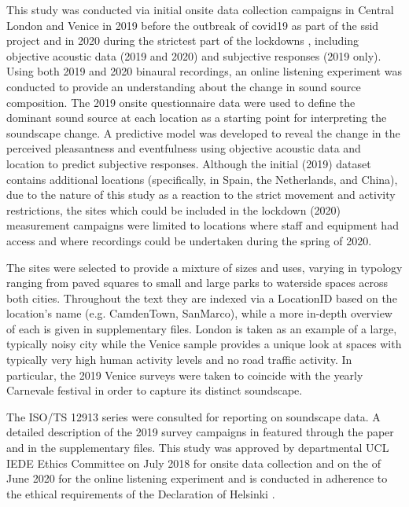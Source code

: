  This study was conducted via initial onsite data collection campaigns in Central London and Venice in 2019 before the outbreak of \gls{covid19} as part of the \gls{ssid} project \citep{Mitchell2020Soundscape} and in 2020 during the strictest part of the lockdowns \citep{Aletta2020Assessing}, including objective acoustic data (2019 and 2020) and subjective responses (2019 only). Using both 2019 and 2020 binaural recordings, an online listening experiment was conducted to provide an understanding about the change in sound source composition. The 2019 onsite questionnaire data were used to define the dominant sound source at each location as a starting point for interpreting the soundscape change. A predictive model was developed to reveal the change in the perceived pleasantness and eventfulness using objective acoustic data and location to predict subjective responses. Although the initial (2019) dataset contains additional locations (specifically, in Spain, the Netherlands, and China), due to the nature of this study as a reaction to the strict movement and activity restrictions, the sites which could be included in the lockdown (2020) measurement campaigns were limited to locations where staff and equipment had access and where recordings could be undertaken during the spring of 2020.

 The sites were selected to provide a mixture of sizes and uses, varying in typology ranging from paved squares to small and large parks to waterside spaces across both cities. Throughout the text they are indexed via a LocationID based on the location's name (e.g. CamdenTown, SanMarco), while a more in-depth overview of each is given in supplementary files. %
 London is taken as an example of a large, typically noisy city while the Venice sample provides a unique look at spaces with typically very high human activity levels and no road traffic activity. In particular, the 2019 Venice surveys were taken to coincide with the yearly Carnevale festival in order to capture its distinct soundscape.

 The ISO/TS 12913 \citep{ISO12913_2_2018IOS} series were consulted for reporting on soundscape data. A detailed description of the 2019 survey campaigns in featured through the paper and in the supplementary files. This study was approved by departmental UCL IEDE Ethics Committee on  July 2018 for onsite data collection and on the  of June 2020 for the online listening experiment and is conducted in adherence to the ethical requirements of the Declaration of Helsinki \citep{WMA2013World}.

